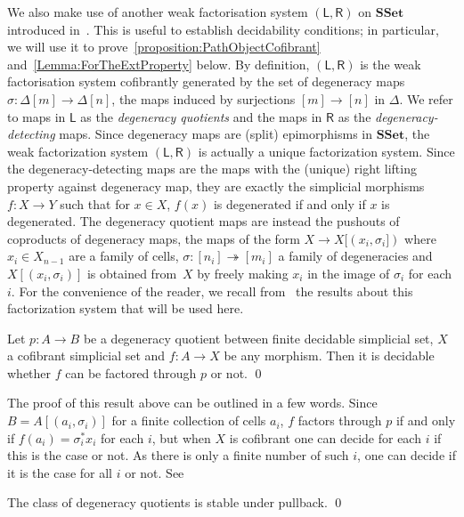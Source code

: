 \documentclass[reqno,10pt,a4paper,oneside,draft]{amsart}
\numberwithin{equation}{section}
\theoremstyle{mythm}
\theoremstyle{mydef}
\theoremstyle{myrmk}
\newcommand{\ie}{\text{i.e.\ }}
\newcommand{\co}{\colon}
\newcommand{\SSet}{\mathbf{SSet}}
\begin{document}
We also make use of another weak factorisation system $(\mathsf{L}, \mathsf{R})$ on $\SSet$ introduced in~\cite[Section~3.1]{henry2019qms}. This is useful to establish decidability conditions; in particular, we will use it to prove~\cref{proposition:PathObjectCofibrant} and~\cref{Lemma:ForTheExtProperty} below. By definition, $(\mathsf{L}, \mathsf{R})$ is the
weak factorisation system cofibrantly generated by the set of degeneracy maps $\sigma \co \Delta[m] \to \Delta[n]$, \ie the maps induced by surjections $[m] \rightarrow [n]$ in $\Delta$. We refer to maps in $\mathsf{L}$ as the \emph{degeneracy quotients} and the
maps in $\mathsf{R}$ as the \emph{degeneracy-detecting} maps. Since degeneracy maps are (split) epimorphisms in $\SSet$, the weak factorization system $(\mathsf{L}, \mathsf{R})$ is actually a unique factorization system. Since the degeneracy-detecting maps are the maps with the (unique) right lifting property against degeneracy map,  they are exactly the simplicial morphisms $f \co X \rightarrow Y$ such that for $x \in X$, $f(x)$ is degenerated if and only if $x$ is degenerated. The degeneracy quotient maps are
instead the pushouts of coproducts of degeneracy maps, \ie the maps of the form $X \rightarrow X[(x_i,\sigma_i])$ where $x_i \in X_{n-1}$ are a family of cells,  $\sigma \co [n_i] \twoheadrightarrow [m_i]$ a family of degeneracies and $X[(x_i,\sigma_i)]$ is obtained from~$X$ by freely making $x_i$ in the image of $\sigma_i $ for each $i$. For the convenience of the reader, we recall from~\cite{henry2019qms} 
 the results  about this factorization system that will be used here.


\begin{lemma}
\label{lem:decidability_lift_degen_quo}
Let $p \co A \rightarrow B$ be a degeneracy quotient between finite decidable simplicial set, $X$  a cofibrant simplicial set and $f \co
A \rightarrow X$ be any morphism. Then it is decidable whether $f$ can be factored through $p$ or not.  \qed
\end{lemma}

The proof of this result above can be outlined in a few words. Since $B = A[(a_i,\sigma_i)]$ for a finite collection of cells $a_i$,  $f$ factors through $p$ if and only if $f(a_i) =\sigma_i^*  x_i$ for each $i$, but when $X$ is cofibrant one can decide for each $i$ if this is the case or not. As there is only a finite number of such $i$, one can decide if it is the case for all $i$ or not. See


\begin{proposition}
\label{prop:Degen_quotient_are_pullback_stable}
The class of degeneracy quotients is stable under pullback.  \qed
\end{proposition}
\end{document}
